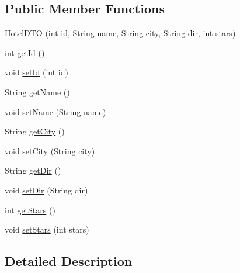\subsection*{Public Member Functions}
\begin{DoxyCompactItemize}
\item 
\mbox{\hyperlink{classbspq18__e4_1_1_gestion_hotelera_1_1server_1_1dto_1_1_hotel_d_t_o_afdb03b80f4dcbdddf2cc431414950672}{Hotel\+D\+TO}} (int id, String name, String city, String dir, int stars)
\item 
int \mbox{\hyperlink{classbspq18__e4_1_1_gestion_hotelera_1_1server_1_1dto_1_1_hotel_d_t_o_a3a8f1d6ba0516c9ce864a355bd0577f0}{get\+Id}} ()
\item 
void \mbox{\hyperlink{classbspq18__e4_1_1_gestion_hotelera_1_1server_1_1dto_1_1_hotel_d_t_o_adda609bc87f9828e88afd7b5c78690c9}{set\+Id}} (int id)
\item 
String \mbox{\hyperlink{classbspq18__e4_1_1_gestion_hotelera_1_1server_1_1dto_1_1_hotel_d_t_o_a2259f8aed90c72e55c8b64981620cb5e}{get\+Name}} ()
\item 
void \mbox{\hyperlink{classbspq18__e4_1_1_gestion_hotelera_1_1server_1_1dto_1_1_hotel_d_t_o_ae2273316961f6e26e9d31ba4b447392a}{set\+Name}} (String name)
\item 
String \mbox{\hyperlink{classbspq18__e4_1_1_gestion_hotelera_1_1server_1_1dto_1_1_hotel_d_t_o_a7c52e2d952044f16bb58d77a239ab8ec}{get\+City}} ()
\item 
void \mbox{\hyperlink{classbspq18__e4_1_1_gestion_hotelera_1_1server_1_1dto_1_1_hotel_d_t_o_acd008fcfc88f32ad169feb9e794616a2}{set\+City}} (String city)
\item 
String \mbox{\hyperlink{classbspq18__e4_1_1_gestion_hotelera_1_1server_1_1dto_1_1_hotel_d_t_o_a9cccefd102f1819e853a29ffa2f6df64}{get\+Dir}} ()
\item 
void \mbox{\hyperlink{classbspq18__e4_1_1_gestion_hotelera_1_1server_1_1dto_1_1_hotel_d_t_o_ad94854840c4df05951a8fe17bcaf79ff}{set\+Dir}} (String dir)
\item 
int \mbox{\hyperlink{classbspq18__e4_1_1_gestion_hotelera_1_1server_1_1dto_1_1_hotel_d_t_o_a8281ad1720a0e70ecf3299dc837b30fd}{get\+Stars}} ()
\item 
void \mbox{\hyperlink{classbspq18__e4_1_1_gestion_hotelera_1_1server_1_1dto_1_1_hotel_d_t_o_a95e1a952bfcd3d8e7eaf46d10933231e}{set\+Stars}} (int stars)
\end{DoxyCompactItemize}


\subsection{Detailed Description}


